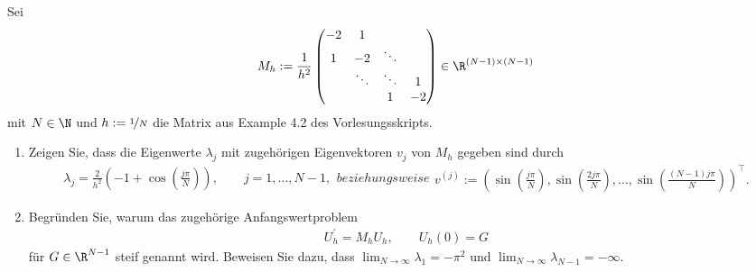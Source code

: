 \begin{exercise}
Sei
\begin{align}
  M_h := \frac{1}{h^2}\begin{pmatrix}
    -2 & 1 & &  \\
    1 & -2 & \ddots & \\
    & \ddots & \ddots & 1 \\
    & & 1 & -2
  \end{pmatrix}
  \in \R^{(N-1)\times (N-1)}
\end{align}
mit $N \in \N$ und $h := \nicefrac{1}{N}$ die Matrix aus Example 4.2 des Vorlesungsskripts.
\begin{enumerate}[label = \textbf{\alph*)}]
  \item Zeigen Sie, dass die Eigenwerte $\lambda_j$ mit zugehörigen Eigenvektoren $v_j$
  von $M_h$ gegeben sind durch
  \begin{subequations}
  \begin{align}\label{ew}
    \lambda_j = \frac{2}{h^2}\left(-1 + \cos\left(\frac{j\pi}{N}\right)\right),
    \qquad j = 1,\dots,N-1,
  \end{align}
  beziehungsweise
  \begin{align}
    v^{(j)} := \left(\sin\left(\frac{j\pi}{N}\right), \sin\left(\frac{2j\pi}{N}\right),\dots,
    \sin\left(\frac{(N-1)j\pi}{N}\right)\right)^{\top}.
  \end{align}
  \end{subequations}
  \item Begründen Sie, warum das zugehörige Anfangswertproblem
  \begin{align}\label{awp}
    U_h^{\prime} = M_hU_h, \qquad U_h(0) = G
  \end{align}
  für $G \in \R^{N-1}$ steif genannt wird. Beweisen Sie dazu, dass
  $\lim_{N \rightarrow \infty} \lambda_1 = -\pi^2$ und
  $\lim_{N \rightarrow \infty} \lambda_{N-1} = -\infty$.
\end{enumerate}
\end{exercise}
